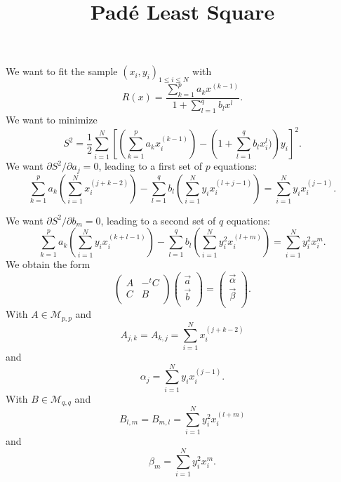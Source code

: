 \documentclass[aps,twocolumn]{revtex4}
\begin{document}
\title{Padé Least Square}
We want to fit the sample $(x_i,y_i)_{1\leq i \leq N}$
with
$$
	R(x) = \dfrac{\displaystyle\sum_{k=1}^p a_k x^{(k-1)}}{\displaystyle 1+\sum_{l=1}^q b_l x^{l}}.
$$
We want to minimize
$$
	S^2 = \dfrac{1}{2}\sum_{i=1}^N \left[ \left(\sum_{k=1}^p a_k x_i^{(k-1)}\right) - \left(1+\sum_{l=1}^{q} b_l x_i^l)\right)y_i  \right]^2.
$$
We want	$\partial S^2/\partial a_j=0$, leading to a first set of $p$ equations:
$$
	\sum_{k=1}^{p} a_k \left(\sum_{i=1}^{N}x_i^{(j+k-2)}\right) - 
	\sum_{l=1}^{q} b_l \left(\sum_{i=1}^N y_i x_i^{(l+j-1)} \right) = \sum_{i=1}^N y_i x_i^{(j-1)}.
$$

We want $\partial S^2/\partial b_m=0$, leading to a second set of $q$ equations:
$$
	\sum_{k=1}^p a_k \left(\sum_{i=1}^N y_ix_i^{(k+l-1)}\right) - 
	\sum_{l=1}^q b_l \left(\sum_{i=1}^N y_i^2 x_i^{(l+m)}\right) = \sum_{i=1}^N y_i^2 x_i^{m}.
$$
We obtain the form
$$
	\begin{pmatrix}
	A & -\!\!^tC\\
	 C & B\\
	\end{pmatrix}
	\begin{pmatrix}
	\vec{a} \\
	\vec{b} \\
	\end{pmatrix}
	=
	\begin{pmatrix}
	\vec{\alpha}\\
	\vec{\beta} \\
	\end{pmatrix}.
$$
With $A\in\mathcal{M}_{p,p}$ and
$$
	A_{j,k} = A_{k,j} = \sum_{i=1}^N x_i^{(j+k-2)}
$$
and
$$
	\alpha_j = \sum_{i=1}^N y_ix_i^{(j-1)}.
$$
With $B\in\mathcal{M}_{q,q}$ and
$$
	B_{l,m} = B_{m,l} = \sum_{i=1}^N y_i^2x_i^{(l+m)}
$$
and
$$
	\beta_m = \sum_{i=1}^N y_i^2 x_i^{m}.
$$
\end{document}
